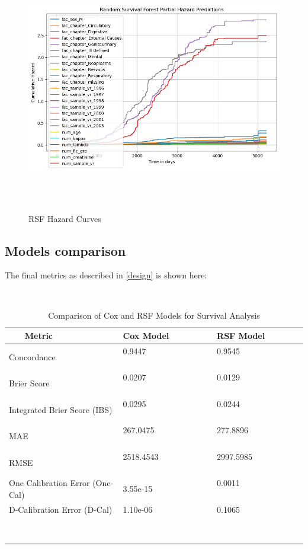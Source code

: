 \begin{figure}[h]
    \centering
    \includegraphics[scale=0.50]{Figures/SURV/rsf_hazard.png}
    \caption{RSF Hazard Curves}
    \label{fig:rsf_haz}
\end{figure}

\clearpage
\subsection{Models comparison} 

The final metrics as described in \ref{design} is shown here:

\begin{table}[h!]
    \centering
    \begin{tabular}{|l|l|l|}
\hline
    \textbf{Metric}           & \textbf{Cox Model}         & \textbf{RSF Model}        \\ \hline
 Concordance               & 0.9447                     & 0.9545                    \\ \hline
 Brier Score               & 0.0207                     & 0.0129                    \\ \hline
 Integrated Brier Score (IBS) & 0.0295                     & 0.0244                    \\ \hline
 MAE                       & 267.0475                   & 277.8896                  \\ \hline
 RMSE                      & 2518.4543                  & 2997.5985                 \\ \hline
 One Calibration Error (One-Cal) & 3.55e-15                 & 0.0011                    \\ \hline
 D-Calibration Error (D-Cal)  & 1.10e-06                   & 0.1065                    \\ \hline
    \end{tabular}
    \caption{Comparison of Cox and RSF Models for Survival Analysis}
    \label{tab:cox_rsf_comparison}
\end{table}

